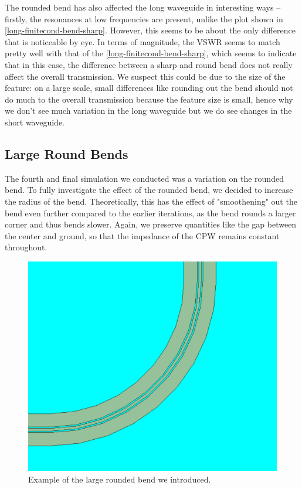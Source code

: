 The rounded bend has also affected the long waveguide in interesting ways -- firstly, the resonances at low
frequencies are present, unlike the plot shown in \cref{long-finitecond-bend-sharp}. However, this seems to
be about the only difference that is noticeable by eye. In terms of magnitude, the VSWR seems to match pretty
well with that of the \cref{long-finitecond-bend-sharp}, which seems to indicate that in this case, the
difference between a sharp and round bend does not really affect the overall transmission. We suspect this
could be due to the size of the feature: on a large scale, small differences like rounding out the bend should not do
much to the overall transmission because the feature size is small, hence why we don't see much variation in
the long waveguide but we do see changes in the short waveguide. 

\subsection{Large Round Bends}

The fourth and final simulation we conducted was a variation on the rounded bend. To fully investigate the
effect of the rounded bend, we decided to increase the radius of the bend. Theoretically, this has the
effect of "smoothening" out the bend even further compared to the earlier iterations, as the bend rounds a
larger corner and thus bends slower. Again, we preserve quantities like the gap between the center and
ground, so that the impedance of the CPW remains constant throughout.   

\begin{figure}
	\centering
	\includegraphics[scale=0.3]{images/model/large-bend.png}
	\caption{Example of the large rounded bend we introduced.}  
	\label{large-bend}
\end{figure}

